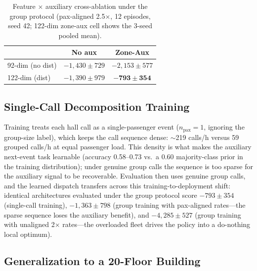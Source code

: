 \documentclass{IEEEcsmag}
\begin{document}
\begin{table}[t]
\caption{Feature $\times$ auxiliary cross-ablation under the group
protocol (pax-aligned 2.5$\times$, 12 episodes, seed 42; 122-dim
zone-aux cell shows the 3-seed pooled mean).}
\label{tab:synergy}
\begin{tabular}{@{}lcc@{}}
\toprule
 & No aux & Zone-Aux \\
\midrule
92-dim (no dist) & $-1{,}430 \pm 729$ & $-2{,}153 \pm 577$ \\
122-dim (dist)   & $-1{,}390 \pm 979$ & $\mathbf{-793 \pm 354}$ \\
\bottomrule
\end{tabular}
\end{table}

\subsection{Single-Call Decomposition Training}

Training treats each hall call as a single-passenger event
($n_{\text{pax}} = 1$, ignoring the group-size label), which keeps
the call sequence dense: $\sim$219 calls/h versus 59 grouped
calls/h at equal passenger load. This density is what makes the
auxiliary next-event task learnable (accuracy 0.58--0.73 vs.~a 0.60
majority-class prior in the training distribution); under genuine group calls the sequence is too sparse for the
auxiliary signal to be recoverable. Evaluation then uses genuine
group calls, and the learned dispatch transfers across this
training-to-deployment shift: identical architectures evaluated under
the group protocol score $-793 \pm 354$ (single-call training),
$-1{,}363 \pm 798$ (group training with pax-aligned rates---the
sparse sequence loses the auxiliary benefit), and $-4{,}285 \pm
527$ (group training with unaligned 2$\times$ rates---the overloaded
fleet drives the policy into a do-nothing local optimum).

\subsection{Generalization to a 20-Floor Building}
\end{document}
